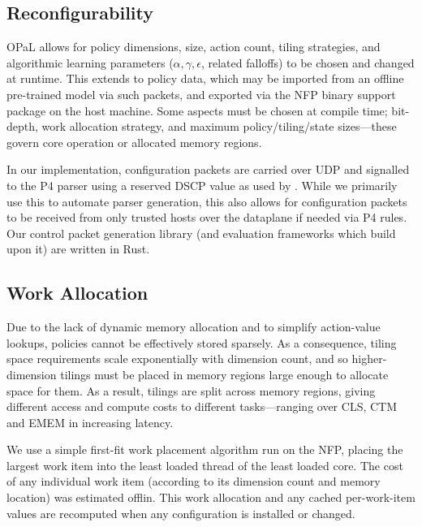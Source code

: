 \documentclass[sigconf,natbib=false]{acmart}
\newcommand{\approachshort}{OPaL}
\begin{document}
\subsection{Reconfigurability}
\approachshort{} allows for policy dimensions, size, action count, tiling strategies, and algorithmic learning parameters ($\alpha, \gamma, \epsilon$, related falloffs) to be chosen and changed at runtime.
This extends to policy data, which may be imported from an offline pre-trained model via such packets, and exported via the NFP binary support package on the host machine.
Some aspects must be chosen at compile time; bit-depth, work allocation strategy, and maximum policy/tiling/state sizes---these govern core operation or allocated memory regions.

In our implementation, configuration packets are carried over UDP and signalled to the P4 parser using a reserved DSCP value as used by \textcite{DBLP:conf/isca/LiLYCSH19}.
While we primarily use this to automate parser generation, this also allows for configuration packets to be received from only trusted hosts over the dataplane if needed via P4 rules.
Our control packet generation library (and evaluation frameworks which build upon it) are written in Rust.

\subsection{Work Allocation}
Due to the lack of dynamic memory allocation and to simplify action-value lookups, policies cannot be effectively stored sparsely.
As a consequence, tiling space requirements scale exponentially with dimension count, and so higher-dimension tilings must be placed in memory regions large enough to allocate space for them.
As a result, tilings are split across memory regions, giving different access and compute costs to different tasks---ranging over CLS, CTM and EMEM in increasing latency.

We use a simple first-fit work placement algorithm run on the NFP, placing the largest work item into the least loaded thread of the least loaded core.
The cost of any individual work item (according to its dimension count and memory location) was estimated offlin.
This work allocation and any cached per-work-item values are recomputed when any configuration is installed or changed.
\end{document}
